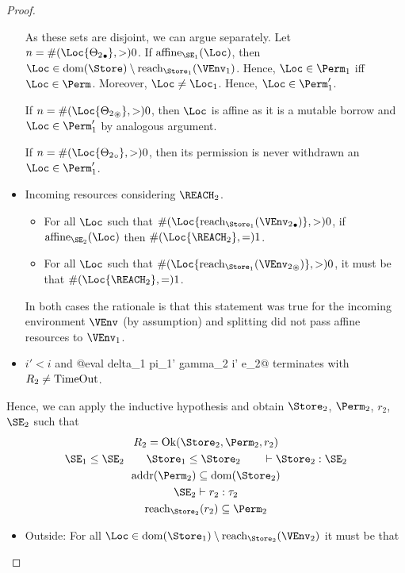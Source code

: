 \begin{proof}
\begin{itemize}
    As these sets are disjoint, we can argue separately.
    Let $n = \MultiNumber\Loc{\Active{\Theta_2}}>0$.
    If $\Affine{\SE_1}\Loc$, then $\Loc \in \Dom{\Store} \setminus
    \Reach{\Store_1}{\VEnv_1}$. Hence, $\Loc\in\Perm_1$ iff
    $\Loc\in\Perm$. Moreover, $\Loc\ne\Loc_1$. Hence,
    $\Loc\in\Perm_1'$.

    If  $n = \MultiNumber\Loc{\MutableBorrows{\Theta_2}}>0$,
    then $\Loc$ is affine as it is a mutable borrow and
    $\Loc\in\Perm_1'$ by analogous argument.

    If  $n = \MultiNumber\Loc{\ImmutableBorrows{\Theta_2}}>0$,
    then its permission is never withdrawn an $\Loc\in\Perm_1'$.
  \item Incoming resources considering $\REACH_2$.
    \begin{itemize}
    \item 
      For all $\Loc$ such that $\MultiNumber\Loc{\Reach{\Store_1}{\Active{\VEnv_2}}} >0$,
      if $\Affine{\SE_2}\Loc$ then $\MultiNumber\Loc{\REACH_2}= 1$.
    \item For all $\Loc$ such that $
      \MultiNumber\Loc{\Reach{\Store_1}{\MutableBorrows{\VEnv_2}}} >0$, it
      must be that $\MultiNumber\Loc{\REACH_2}=1$.
    \end{itemize}
    In both cases the rationale is that this statement was true for
    the incoming environment $\VEnv$ (by assumption) and splitting did
    not pass affine resources to $\VEnv_1$. 
  \item $i'<i$ and  @eval delta_1 pi_1' gamma_2 i' e_2@ terminates
    with $R_2 \ne \operatorname{TimeOut}$.
  \end{itemize}
  Hence, we can apply the inductive hypothesis and obtain
  $\Store_2$, $\Perm_2$, $r_2$, $\SE_2$ such that
  \begin{gather}
    \label{eq:6}
    R_2 = \Ok{\Store_2, \Perm_2, r_2}
    \\\label{eq:7}
    \SE_1 \le \SE_2 \qquad
    \Store_1 \le \Store_2 \qquad
    \vdash \Store_2 :  \SE_2
    \\\label{eq:9}
    \Addresses{\Perm_2} \subseteq \Dom{\Store_2}
    \\\label{eq:8}
    \SE_2 \vdash r_2 : \tau_2
    \\\label{eq:11}
    \Reach{\Store_2}{r_2} \subseteq \Perm_2
  \end{gather}
  \begin{itemize}
  \item Outside: For all $\Loc \in \Dom{\Store_1} \setminus
    \Reach{\Store_2}{\VEnv_2}$ it must be that 

\end{itemize}
\end{proof}
